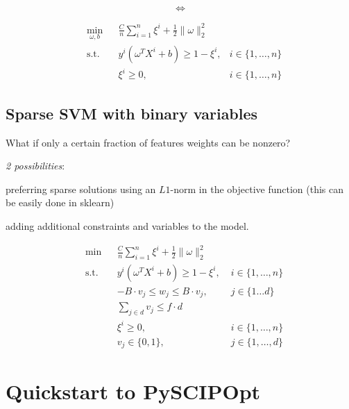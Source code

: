 \documentclass[12pt]{article}
\begin{document}
$$ \Leftrightarrow $$

\begin{equation*} \begin{aligned}
  & \min\limits_{\omega, b}
  & & \frac{C}{n} \sum\limits_{i = 1}^{n} \xi^{i} + \frac{1}{2} \lVert \omega \rVert_{2}^{2}\\
  & \text{s.t.}\;
  & &  y^{i} (\omega^{T} X^{i} +b) \geq 1 - \xi^{i}, &  i \in \{1,\dots,n\}\\
  & & & \xi^{i} \geq 0, & i \in \{1,\dots, n\}
\end{aligned} \end{equation*}

\subsection*{Sparse SVM with binary variables}

What if only a certain fraction of features weights can be nonzero?

\emph{2 possibilities}:
\begin{compactitem}[$\circ$]
  \item preferring sparse solutions using an $L1$-norm in the objective function (this can be easily done in sklearn)
  \item adding additional constraints and variables to the model.
\end{compactitem}
\begin{equation*}
  \begin{aligned}
    & \min
    & & \frac{C}{n} \sum\limits_{i = 1}^{n} \xi^{i} + \frac{1}{2} \lVert \omega \rVert_{2}^{2}\\
    & \text{s.t.}
    & & y^{i} (\omega^{T} X^{i} + b) \geq 1 - \xi^{i}, \; & i \in \{1,\dots,n\}\\
    & & & -B \cdot v_{j} \leq w_{j} \leq B \cdot v_{j}, \; & j \in \{ 1 \dots d \}\\
    & & & \sum_{j \in d} v_{j} \leq f \cdot d\\
    & & & \xi^{i} \geq 0, \; & i \in \{1, \dots, n\} \\
    & & & v_{j} \in \{0,1\}, & j \in \{1,\dots, d\}
  \end{aligned}
\end{equation*}











\section*{Quickstart to PySCIPOpt}
\end{document}
